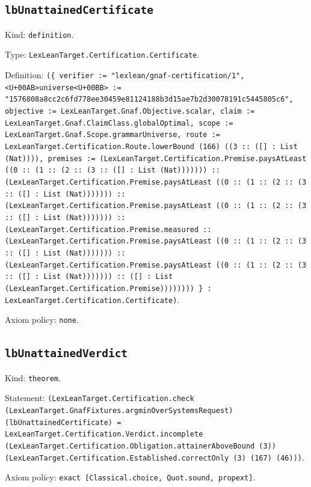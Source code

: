 \documentclass[11pt]{article}
\begin{document}
\subsection*{\texttt{lbUnattainedCertificate}}
\noindent Kind: \texttt{definition}.\par
\noindent Type: \texttt{LexLeanTarget.Certification.Certificate}.\par
\noindent Definition: \texttt{(\{ verifier := "lexlean/gnaf-certification/1", <U+00AB>universe<U+00BB> := "1576808a8cc2c6fd778ee30459e81124188b3d15ae7b2d30078191c5445805c6", objective := LexLeanTarget.Gnaf.Objective.scalar, claim := LexLeanTarget.Gnaf.ClaimClass.globalOptimal, scope := LexLeanTarget.Gnaf.Scope.grammarUniverse, route := LexLeanTarget.Certification.Route.lowerBound (166) ((3 :: ([] : List (Nat)))), premises := (LexLeanTarget.Certification.Premise.paysAtLeast ((0 :: (1 :: (2 :: (3 :: ([] : List (Nat))))))) :: (LexLeanTarget.Certification.Premise.paysAtLeast ((0 :: (1 :: (2 :: (3 :: ([] : List (Nat))))))) :: (LexLeanTarget.Certification.Premise.paysAtLeast ((0 :: (1 :: (2 :: (3 :: ([] : List (Nat))))))) :: (LexLeanTarget.Certification.Premise.measured :: (LexLeanTarget.Certification.Premise.paysAtLeast ((0 :: (1 :: (2 :: (3 :: ([] : List (Nat))))))) :: (LexLeanTarget.Certification.Premise.paysAtLeast ((0 :: (1 :: (2 :: (3 :: ([] : List (Nat))))))) :: ([] : List (LexLeanTarget.Certification.Premise)))))))) \} : LexLeanTarget.Certification.Certificate)}.\par
\noindent Axiom policy: \texttt{none}.\par
\subsection*{\texttt{lbUnattainedVerdict}}
\noindent Kind: \texttt{theorem}.\par
\noindent Statement: \texttt{(LexLeanTarget.Certification.check (LexLeanTarget.GnafFixtures.argminOverSystemsRequest) (lbUnattainedCertificate) = LexLeanTarget.Certification.Verdict.incomplete (LexLeanTarget.Certification.Obligation.attainerAboveBound (3)) (LexLeanTarget.Certification.Established.correctOnly (3) (167) (46)))}.\par
\noindent Axiom policy: \texttt{exact [Classical.choice, Quot.sound, propext]}.\par
\end{document}
